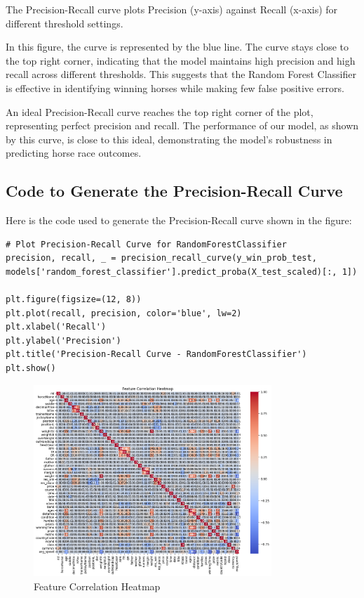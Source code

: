 \documentclass{article}
\begin{document}
The Precision-Recall curve plots Precision (y-axis) against Recall (x-axis) for different threshold settings.

In this figure, the curve is represented by the blue line. The curve stays close to the top right corner, indicating that the model maintains high precision and high recall across different thresholds. This suggests that the Random Forest Classifier is effective in identifying winning horses while making few false positive errors.

An ideal Precision-Recall curve reaches the top right corner of the plot, representing perfect precision and recall. The performance of our model, as shown by this curve, is close to this ideal, demonstrating the model's robustness in predicting horse race outcomes.

\subsection*{Code to Generate the Precision-Recall Curve}

Here is the code used to generate the Precision-Recall curve shown in the figure:

\begin{verbatim}
# Plot Precision-Recall Curve for RandomForestClassifier
precision, recall, _ = precision_recall_curve(y_win_prob_test, models['random_forest_classifier'].predict_proba(X_test_scaled)[:, 1])

plt.figure(figsize=(12, 8))
plt.plot(recall, precision, color='blue', lw=2)
plt.xlabel('Recall')
plt.ylabel('Precision')
plt.title('Precision-Recall Curve - RandomForestClassifier')
plt.show()
\end{verbatim}

\begin{figure}[H]
    \centering
    \includegraphics[width=0.8\textwidth]{images/feature_correlation_heatmap.png} %
    \caption{Feature Correlation Heatmap}
    \label{fig:feature_correlation_heatmap}
\end{figure}
\end{document}
